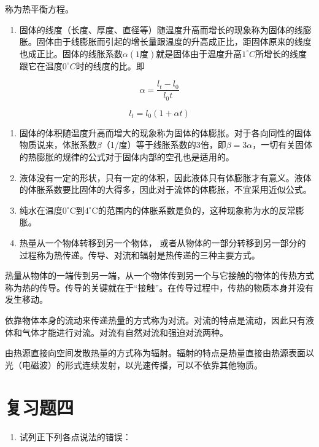 称为热平衡方程。

\begin{enumerate}
\def\labelenumi{\arabic{enumi}.}
\setcounter{enumi}{6}
\tightlist
\item
  固体的线度（长度、厚度、直径等）随温度升高而增长的现象称为固体的线膨胀。固体由于线膨胀而引起的增长量跟温度的升高成正比，距固体原来的线度也成正比。固体的线胀系数\(\alpha(1\text{度})\)就是固体由于温度升高\(1^{\circ}C\)所增长的线度跟它在温度\(0^{\circ}C\)时的线度的比。即
\end{enumerate}

\[
\alpha = \frac {l _ {t} - l _ {0}}{l _ {0} t}
\]

\[
l _ {t} = l _ {0} (1 + \alpha t)
\]

\begin{enumerate}
\def\labelenumi{\arabic{enumi}.}
\setcounter{enumi}{7}
\item
  固体的体积随温度升高而增大的现象称为固体的体膨胀。对于各向同性的固体物质说来，体胀系数\(\beta\)（1/度）等于线胀系数的3倍，即\(\beta = 3\alpha\)，一切有关固体的热膨胀的规律的公式对于固体内部的空孔也是适用的。
\item
  液体没有一定的形状，只有一定的体积，因此液体只有体膨胀才有意义。液体的体胀系数要比固体的大得多，因此对于流体的体膨胀，不宜采用近似公式。
\item
  纯水在温度\(0^{\circ} \mathrm{C}\)到\(4^{\circ} \mathrm{C}\)的范围内的体胀系数是负的，这种现象称为水的反常膨胀。
\item
  热量从一个物体转移到另一个物体，
  或者从物体的一部分转移到另一部分的过程称为热传递。传导、对流和辐射是热传递的三种主要方式。
\end{enumerate}

热量从物体的一端传到另一端，从一个物体传到另一个与它接触的物体的传热方式称为热的传导。传导的关键就在于``接触''。在传导过程中，传热的物质本身并没有发生移动。

依靠物体本身的流动来传递热量的方式称为对流。对流的特点是流动，因此只有液体和气体才能进行对流。对流有自然对流和强迫对流两种。

由热源直接向空间发散热量的方式称为辐射。辐射的特点是热量直接由热源表面以光（电磁波）的形式连续发射，以光速传播，可以不依靠其他物质。

\section{复习题四}\label{ux590dux4e60ux9898ux56db}

\begin{enumerate}
\def\labelenumi{\arabic{enumi}.}
\tightlist
\item
  试列正下列各点说法的错误：
\end{enumerate}

